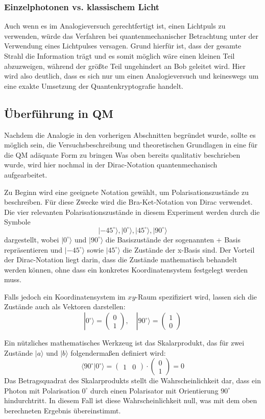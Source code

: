 \subsubsection{Einzelphotonen vs. klassischem Licht}
Auch wenn es im Analogieversuch gerechtfertigt ist, einen Lichtpuls zu verwenden, würde das Verfahren bei quantenmechanischer Betrachtung unter der Verwendung eines Lichtpulses versagen. Grund hierfür ist, dass der gesamte Strahl die Information trägt und es somit möglich wäre einen kleinen Teil abzuzweigen,
während der größte Teil ungehindert an Bob geleitet wird.
Hier wird also deutlich, dass es sich nur um einen Analogieversuch und keineswegs um eine exakte Umsetzung der Quantenkryptografie handelt.

\subsection{Überführung in QM}
Nachdem die Analogie in den vorherigen Abschnitten begründet wurde, sollte es möglich sein, die Versuchsbeschreibung und theoretischen Grundlagen in eine für die QM adäquate Form zu bringen
Was oben bereits qualitativ beschrieben wurde, wird hier nochmal in der Dirac-Notation quantenmechanisch aufgearbeitet. 
 
Zu Beginn wird eine geeignete Notation gewählt, um Polarisationszustände zu beschreiben. Für diese Zwecke wird die Bra-Ket-Notation von Dirac verwendet. Die vier relevanten Polarisationszustände in diesem Experiment werden durch die Symbole
\[
| -45^\circ \rangle, |0^\circ \rangle, |45^\circ \rangle, |90^\circ \rangle
\]
dargestellt, wobei \(|0^\circ \rangle\) und \(|90^\circ \rangle\) die Basiszustände der sogenannten + Basis repräsentieren und \(|-45^\circ \rangle\) sowie \(|45^\circ \rangle\) die Zustände der x-Basis sind. Der Vorteil der Dirac-Notation liegt darin, dass die Zustände mathematisch behandelt werden können, ohne dass ein konkretes Koordinatensystem festgelegt werden muss.

Falls jedoch ein Koordinatensystem im \(xy\)-Raum spezifiziert wird, lassen sich die Zustände auch als Vektoren darstellen:
\[
|0^\circ \rangle = \begin{pmatrix} 0 \\ 1 \end{pmatrix}, \quad |90^\circ \rangle = \begin{pmatrix} 1 \\ 0 \end{pmatrix}
\]

Ein nützliches mathematisches Werkzeug ist das Skalarprodukt, das für zwei Zustände \(|a \rangle\) und \(|b \rangle\) folgendermaßen definiert wird:
\[
\langle 90^\circ | 0^\circ \rangle = \begin{pmatrix} 1 & 0 \end{pmatrix} \cdot \begin{pmatrix} 0 \\ 1 \end{pmatrix} = 0
\]
Das Betragsquadrat des Skalarprodukts stellt die Wahrscheinlichkeit dar, dass ein Photon mit Polarisation \(0^\circ\) durch einen Polarisator mit Orientierung \(90^\circ\) hindurchtritt. In diesem Fall ist diese Wahrscheinlichkeit null, was mit dem oben berechneten Ergebnis übereinstimmt.

